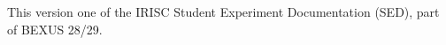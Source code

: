 

\newpage

This version one of the IRISC Student Experiment Documentation (SED),
part of BEXUS 28/29.
